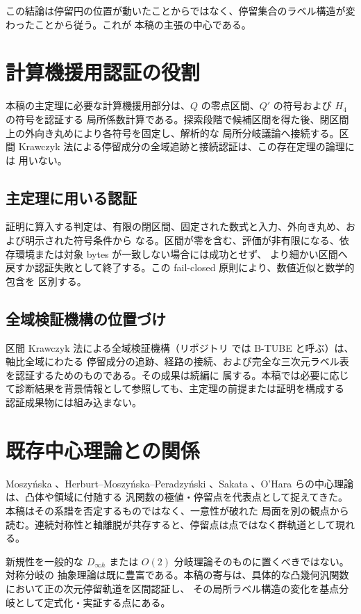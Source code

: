 \documentclass[a4paper,11pt]{ltjsarticle}
\theoremstyle{plain}
\theoremstyle{definition}
\begin{document}
この結論は停留円の位置が動いたことからではなく、停留集合のラベル構造が変わったことから従う。これが
本稿の主張の中心である。

\section{計算機援用認証の役割}

本稿の主定理に必要な計算機援用部分は、\(Q\) の零点区間、\(Q'\) の符号および \(H_4\) の符号を認証する
局所係数計算である。探索段階で候補区間を得た後、閉区間上の外向き丸めにより各符号を固定し、解析的な
局所分岐議論へ接続する。区間 Krawczyk 法による停留成分の全域追跡と接続認証は、この存在定理の論理には
用いない。

\subsection{主定理に用いる認証}

証明に算入する判定は、有限の閉区間、固定された数式と入力、外向き丸め、および明示された符号条件から
なる。区間が零を含む、評価が非有限になる、依存環境または対象 bytes が一致しない場合には成功とせず、
より細かい区間へ戻すか認証失敗として終了する。この fail-closed 原則により、数値近似と数学的包含を
区別する。

\subsection{全域検証機構の位置づけ}

区間 Krawczyk 法による全域検証機構（リポジトリ \cite{Repo} では B-TUBE と呼ぶ）は、軸比全域にわたる
停留成分の追跡、経路の接続、および完全な三次元ラベル表を認証するためのものである。その成果は続編に
属する。本稿では必要に応じて診断結果を背景情報として参照しても、主定理の前提または証明を構成する
認証成果物には組み込まない。

\section{既存中心理論との関係}

Moszyńska \cite{Moszynska}、Herburt–Moszyńska–Peradzyński \cite{HMP}、Sakata \cite{Sakata}、O'Hara \cite{OHara} らの中心理論は、凸体や領域に付随する
汎関数の極値・停留点を代表点として捉えてきた。本稿はその系譜を否定するものではなく、一意性が破れた
局面を別の観点から読む。連続対称性と軸離脱が共存すると、停留点は点ではなく群軌道として現れる。

新規性を一般的な \(D_{\infty h}\) または \(O(2)\) 分岐理論そのものに置くべきではない。対称分岐の
抽象理論は既に豊富である。本稿の寄与は、具体的な凸幾何汎関数において正の次元停留軌道を区間認証し、
その局所ラベル構造の変化を基点分岐として定式化・実証する点にある。
\end{document}
